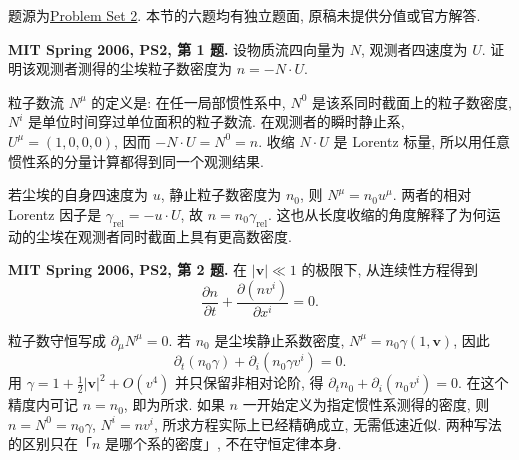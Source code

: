
题源为\href{https://ocw.mit.edu/courses/8-962-general-relativity-spring-2020/resources/mit8_962s20_pset02/}{Problem Set 2}. 本节的六题均有独立题面, 原稿未提供分值或官方解答.

\begin{exercise}
\textbf{MIT Spring 2006, PS2, 第 1 题.} 设物质流四向量为 $N$, 观测者四速度为 $U$. 证明该观测者测得的尘埃粒子数密度为 $n=-N\cdot U$.
\end{exercise}
\begin{solution}
粒子数流 $N^\mu$ 的定义是: 在任一局部惯性系中, $N^0$ 是该系同时截面上的粒子数密度, $N^i$ 是单位时间穿过单位面积的粒子数流. 在观测者的瞬时静止系, $U^\mu=(1,0,0,0)$, 因而 $-N\cdot U=N^0=n$. 收缩 $N\cdot U$ 是 Lorentz 标量, 所以用任意惯性系的分量计算都得到同一个观测结果.

若尘埃的自身四速度为 $u$, 静止粒子数密度为 $n_0$, 则 $N^\mu=n_0u^\mu$. 两者的相对 Lorentz 因子是 $\gamma_{\mathrm{rel}}=-u\cdot U$, 故 $n=n_0\gamma_{\mathrm{rel}}$. 这也从长度收缩的角度解释了为何运动的尘埃在观测者同时截面上具有更高数密度.
\end{solution}

\begin{exercise}
\textbf{MIT Spring 2006, PS2, 第 2 题.} 在 $|\boldsymbol v|\ll1$ 的极限下, 从连续性方程得到
\[
 \frac{\partial n}{\partial t}+\frac{\partial(nv^i)}{\partial x^i}=0.
\]
\end{exercise}
\begin{solution}
粒子数守恒写成 $\partial_\mu N^\mu=0$. 若 $n_0$ 是尘埃静止系数密度, $N^\mu=n_0\gamma(1,\boldsymbol v)$, 因此
\[
 \partial_t(n_0\gamma)+\partial_i(n_0\gamma v^i)=0.
\]
用 $\gamma=1+\tfrac12|\boldsymbol v|^2+O(v^4)$ 并只保留非相对论阶, 得 $\partial_t n_0+\partial_i(n_0v^i)=0$. 在这个精度内可记 $n=n_0$, 即为所求. 如果 $n$ 一开始定义为指定惯性系测得的密度, 则 $n=N^0=n_0\gamma$, $N^i=nv^i$, 所求方程实际上已经精确成立, 无需低速近似. 两种写法的区别只在「$n$ 是哪个系的密度」, 不在守恒定律本身.
\end{solution}

